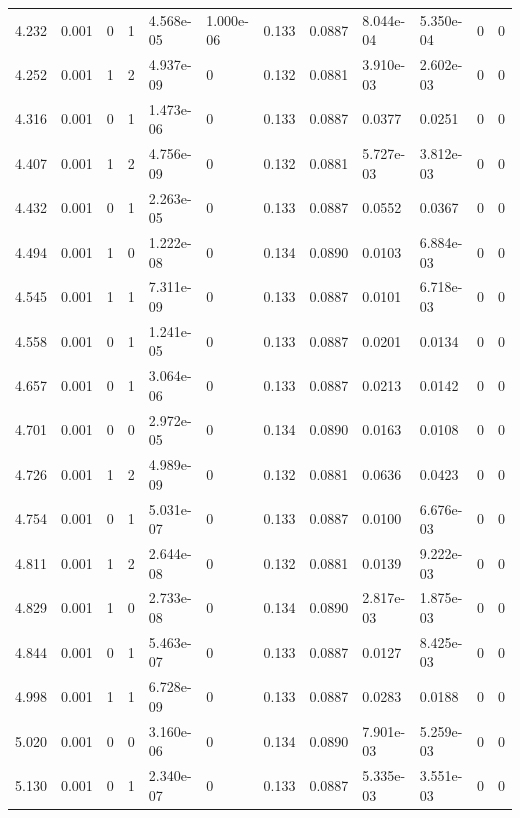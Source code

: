 \documentclass[preview]{standalone}
\begin{document}
{{{\begin{tabular}{L{1.2cm}C{1.2cm} C{0.3cm}C{0.5cm} C{1.4cm}C{1.4cm} C{1.4cm}C{1.4cm} C{1.6cm}C{1.6cm} C{1.6cm}C{1.6cm}}
  4.232  &  0.001  & 0     &  1 &  4.568e-05  & 1.000e-06  &  0.133&   0.0887& 8.044e-04 & 5.350e-04   &  0 & 0  \\ 
  4.252  &  0.001  & 1     &  2 &  4.937e-09  & 0  &  0.132&   0.0881& 3.910e-03 & 2.602e-03   &  0 & 0  \\ 
  4.316  &  0.001  & 0     &  1 &  1.473e-06  & 0  &  0.133&   0.0887& 0.0377 & 0.0251   &  0 & 0  \\ 
  4.407  &  0.001  & 1     &  2 &  4.756e-09  & 0  &  0.132&   0.0881& 5.727e-03 & 3.812e-03   &  0 & 0  \\ 
  4.432  &  0.001  & 0     &  1 &  2.263e-05  & 0  &  0.133&   0.0887& 0.0552 & 0.0367   &  0 & 0  \\ 
  4.494  &  0.001  & 1     &  0 &  1.222e-08  & 0  &  0.134&   0.0890& 0.0103 & 6.884e-03   &  0 & 0  \\ 
  4.545  &  0.001  & 1     &  1 &  7.311e-09  & 0  &  0.133&   0.0887& 0.0101 & 6.718e-03   &  0 & 0  \\ 
  4.558  &  0.001  & 0     &  1 &  1.241e-05  & 0  &  0.133&   0.0887& 0.0201 & 0.0134   &  0 & 0  \\ 
  4.657  &  0.001  & 0     &  1 &  3.064e-06  & 0  &  0.133&   0.0887& 0.0213 & 0.0142   &  0 & 0  \\ 
  4.701  &  0.001  & 0     &  0 &  2.972e-05  & 0  &  0.134&   0.0890& 0.0163 & 0.0108   &  0 & 0  \\ 
  4.726  &  0.001  & 1     &  2 &  4.989e-09  & 0  &  0.132&   0.0881& 0.0636 & 0.0423   &  0 & 0  \\ 
  4.754  &  0.001  & 0     &  1 &  5.031e-07  & 0  &  0.133&   0.0887& 0.0100 & 6.676e-03   &  0 & 0  \\ 
  4.811  &  0.001  & 1     &  2 &  2.644e-08  & 0  &  0.132&   0.0881& 0.0139 & 9.222e-03   &  0 & 0  \\ 
  4.829  &  0.001  & 1     &  0 &  2.733e-08  & 0  &  0.134&   0.0890& 2.817e-03 & 1.875e-03   &  0 & 0  \\ 
  4.844  &  0.001  & 0     &  1 &  5.463e-07  & 0  &  0.133&   0.0887& 0.0127 & 8.425e-03   &  0 & 0  \\ 
  4.998  &  0.001  & 1     &  1 &  6.728e-09  & 0  &  0.133&   0.0887& 0.0283 & 0.0188   &  0 & 0  \\ 
  5.020  &  0.001  & 0     &  0 &  3.160e-06  & 0  &  0.134&   0.0890& 7.901e-03 & 5.259e-03   &  0 & 0  \\ 
  5.130  &  0.001  & 0     &  1 &  2.340e-07  & 0  &  0.133&   0.0887& 5.335e-03 & 3.551e-03   &  0 & 0  \\ 

\end{tabular}}}}
\end{document}
